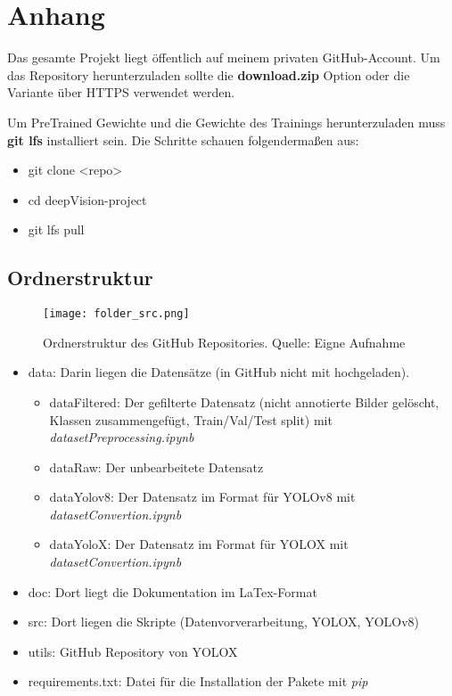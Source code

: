 \chapter{Anhang}\label{chap:appendix}
Das gesamte Projekt liegt öffentlich auf meinem privaten GitHub-Account. Um das Repository herunterzuladen sollte die \textbf{download.zip} Option oder die Variante über HTTPS verwendet werden. \cite{deepvisionProjectGitHub}

Um PreTrained Gewichte und die Gewichte des Trainings herunterzuladen muss \textbf{git lfs} installiert sein.
Die Schritte schauen folgendermaßen aus:
\begin{itemize}
	\item git clone <repo>
	\item cd deepVision-project
	\item git lfs pull
\end{itemize}

\section{Ordnerstruktur}
\begin{figure}[h]
	\centering
	\texttt{[image: folder\_src.png]}
	\caption[Ordnerstruktur des GitHub Repositories]{Ordnerstruktur des GitHub Repositories. Quelle: Eigne Aufnahme}
\end{figure}

\begin{itemize}
	\item data: Darin liegen die Datensätze (in GitHub nicht mit hochgeladen).
	\begin{itemize}
		\item dataFiltered: Der gefilterte Datensatz (nicht annotierte Bilder gelöscht, Klassen zusammengefügt, Train/Val/Test split) mit \textit{datasetPreprocessing.ipynb}
		\item dataRaw: Der unbearbeitete Datensatz \cite{datasetSelfDrivingCar}
		\item dataYolov8: Der Datensatz im Format für YOLOv8 mit \textit{datasetConvertion.ipynb}
		\item dataYoloX:  Der Datensatz im Format für YOLOX mit \textit{datasetConvertion.ipynb}
	\end{itemize}
	\item doc: Dort liegt die Dokumentation im LaTex-Format
	\item src: Dort liegen die Skripte (Datenvorverarbeitung, YOLOX, YOLOv8)
	\item utils: GitHub Repository von YOLOX
	\item requirements.txt: Datei für die Installation der Pakete mit \textit{pip}
\end{itemize}

